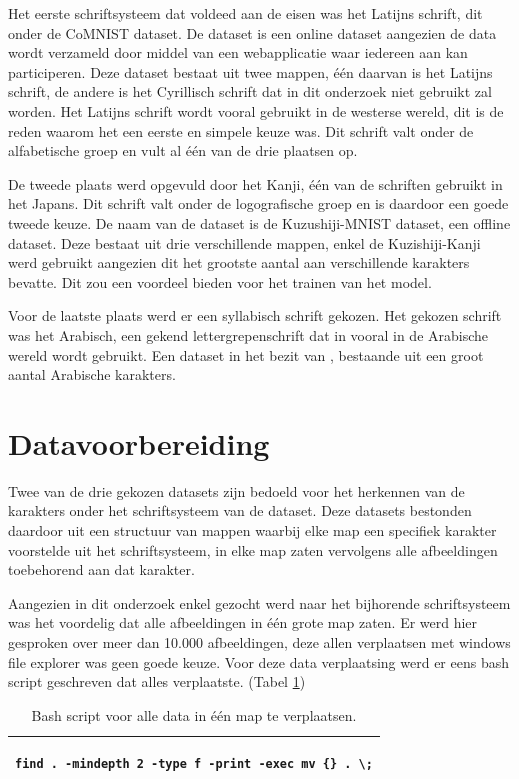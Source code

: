Het eerste schriftsysteem dat voldeed aan de eisen was het Latijns schrift, dit onder de CoMNIST dataset.
De dataset is een online dataset aangezien de data wordt verzameld door middel van een webapplicatie waar iedereen aan kan participeren.
Deze dataset bestaat uit twee mappen, één daarvan is het Latijns schrift, de andere is het Cyrillisch schrift dat in dit onderzoek niet gebruikt zal worden.
Het Latijns schrift wordt vooral gebruikt in de westerse wereld, dit is de reden waarom het een eerste en simpele keuze was.
Dit schrift valt onder de alfabetische groep en vult al één van de drie plaatsen op.

De tweede plaats werd opgevuld door het Kanji, één van de schriften gebruikt in het Japans.
Dit schrift valt onder de logografische groep en is daardoor een goede tweede keuze.
De naam van de dataset is de Kuzushiji-MNIST dataset, een offline dataset.
Deze bestaat uit drie verschillende mappen, enkel de Kuzishiji-Kanji werd gebruikt aangezien dit het grootste aantal aan verschillende karakters bevatte.
Dit zou een voordeel bieden voor het trainen van het model.

Voor de laatste plaats werd er een syllabisch schrift gekozen.
Het gekozen schrift was het Arabisch, een gekend lettergrepenschrift dat in vooral in de Arabische wereld wordt gebruikt.
Een dataset in het bezit van \autocite{Ahmed2017}, bestaande uit een groot aantal Arabische karakters.

\section{Datavoorbereiding}

Twee van de drie gekozen datasets zijn bedoeld voor het herkennen van de karakters onder het schriftsysteem van de dataset.
Deze datasets bestonden daardoor uit een structuur van mappen waarbij elke map een specifiek karakter voorstelde uit het schriftsysteem, in elke map zaten vervolgens alle afbeeldingen toebehorend aan dat karakter.

Aangezien in dit onderzoek enkel gezocht werd naar het bijhorende schriftsysteem was het voordelig dat alle afbeeldingen in één grote map zaten.
Er werd hier gesproken over meer dan 10.000 afbeeldingen, deze allen verplaatsen met windows file explorer was geen goede keuze.
Voor deze data verplaatsing werd er eens bash script geschreven dat alles verplaatste. (Tabel \ref{table:BashScript})

\begin{table}[!htbp]
    \begin{tabular}{|l|}
        \hline
        \begin{lstlisting}
find . -mindepth 2 -type f -print -exec mv {} . \;
        \end{lstlisting}
        \\ \hline
    \end{tabular}
    \caption{Bash script voor alle data in één map te verplaatsen. }\label{table:BashScript}
\end{table}

